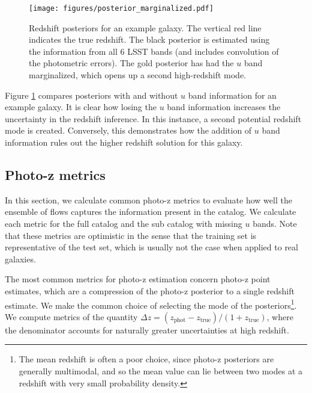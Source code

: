 \documentclass[twocolumn]{aastex631}
\begin{document}
\begin{figure}[t!]
    \begin{centering}
        \texttt{[image: figures/posterior\_marginalized.pdf]}
        \caption{
            Redshift posteriors for an example galaxy.
            The vertical red line indicates the true redshift.
            The black posterior is estimated using the information from all 6 LSST bands (and includes convolution of the photometric errors).
            The gold posterior has had the $u$ band marginalized, which opens up a second high-redshift mode.
        }
        \label{fig:posterior_marginalized}
    \end{centering}
\end{figure}

Figure \ref{fig:posterior_marginalized} compares posteriors with and without $u$ band information for an example galaxy.
It is clear how losing the $u$ band information increases the uncertainty in the redshift inference.
In this instance, a second potential redshift mode is created.
Conversely, this demonstrates how the addition of $u$ band information rules out the higher redshift solution for this galaxy.


\subsection{Photo-z metrics}

In this section, we calculate common photo-z metrics to evaluate how well the ensemble of flows captures the information present in the catalog.
We calculate each metric for the full catalog and the sub catalog with missing $u$ bands.
Note that these metrics are optimistic in the sense that the training set is representative of the test set, which is usually not the case when applied to real galaxies.

The most common metrics for photo-z estimation concern photo-z point estimates, which are a compression of the photo-z posterior to a single redshift estimate.
We make the common choice of selecting the mode of the posteriors\footnote{The mean redshift is often a poor choice, since photo-z posteriors are generally multimodal, and so the mean value can lie between two modes at a redshift with very small probability density.}.
We compute metrics of the quantity $\Delta z = (z_\text{phot} - z_\text{true}) / (1 + z_\text{true})$, where the denominator accounts for naturally greater uncertainties at high redshift.
\end{document}
